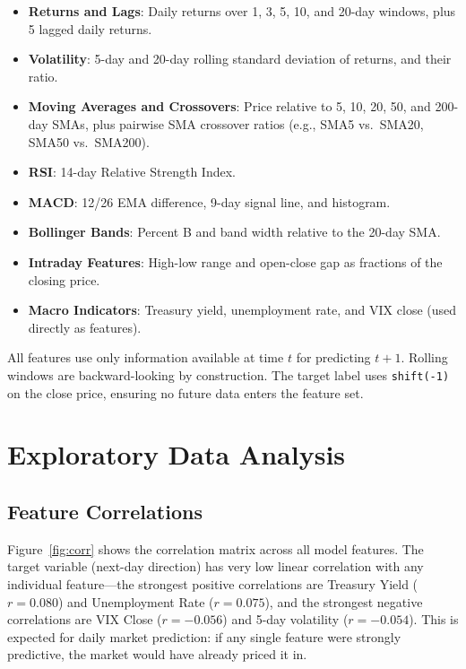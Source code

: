 \documentclass[11pt]{article}
\begin{document}
\begin{itemize}
    \item \textbf{Returns and Lags}: Daily returns over 1, 3, 5, 10, and 20-day windows, plus 5 lagged daily returns.

    \item \textbf{Volatility}: 5-day and 20-day rolling standard deviation of returns, and their ratio.

    \item \textbf{Moving Averages and Crossovers}: Price relative to 5, 10, 20, 50, and 200-day SMAs, plus pairwise SMA crossover ratios (e.g., SMA5 vs.\ SMA20, SMA50 vs.\ SMA200).

    \item \textbf{RSI}: 14-day Relative Strength Index.

    \item \textbf{MACD}: 12/26 EMA difference, 9-day signal line, and histogram.

    \item \textbf{Bollinger Bands}: Percent B and band width relative to the 20-day SMA.

    \item \textbf{Intraday Features}: High-low range and open-close gap as fractions of the closing price.

    \item \textbf{Macro Indicators}: Treasury yield, unemployment rate, and VIX close (used directly as features).
\end{itemize}

All features use only information available at time $t$ for predicting $t+1$. Rolling windows are backward-looking by construction. The target label uses \texttt{shift(-1)} on the close price, ensuring no future data enters the feature set.

\section{Exploratory Data Analysis}
\label{sec:eda}

\subsection{Feature Correlations}

Figure~\ref{fig:corr} shows the correlation matrix across all model features. The target variable (next-day direction) has very low linear correlation with any individual feature---the strongest positive correlations are Treasury Yield ($r = 0.080$) and Unemployment Rate ($r = 0.075$), and the strongest negative correlations are VIX Close ($r = -0.056$) and 5-day volatility ($r = -0.054$). This is expected for daily market prediction: if any single feature were strongly predictive, the market would have already priced it in.
\end{document}
